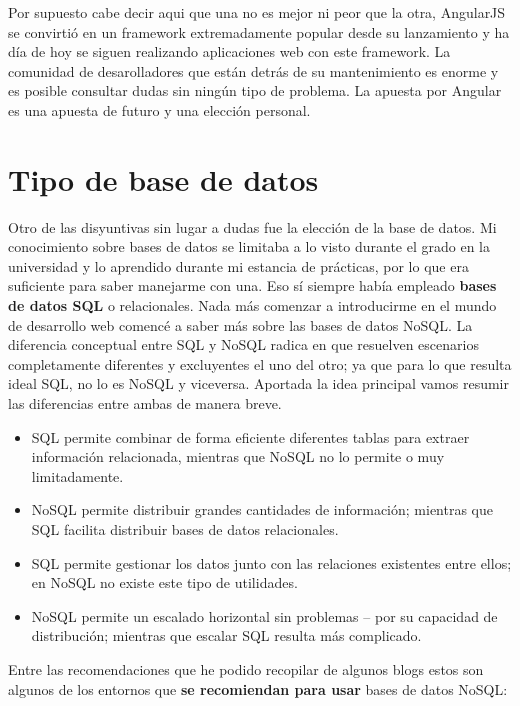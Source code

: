 Por supuesto cabe decir aqui que una no es mejor ni peor que la otra, AngularJS se convirtió en un framework extremadamente popular desde su lanzamiento \cite{angularmarket} y ha día de hoy se siguen realizando aplicaciones web con este framework. La comunidad de desarolladores que están detrás de su mantenimiento es enorme y es posible consultar dudas sin ningún tipo de problema. La apuesta por Angular es una apuesta de futuro y una elección personal.


  \section{Tipo de base de datos}\label{base de datos}
  
  Otro de las disyuntivas sin lugar a dudas fue la elección de la base de datos. Mi conocimiento sobre bases de datos se limitaba a lo visto durante el grado en la universidad y lo aprendido durante mi estancia de prácticas, por lo que era suficiente para saber manejarme con una. Eso sí siempre había empleado \textbf{bases de datos SQL} o relacionales. Nada más comenzar a introducirme en el mundo de desarrollo web comencé a saber más sobre las bases de datos NoSQL. La diferencia conceptual entre SQL y NoSQL radica en que resuelven escenarios completamente diferentes y excluyentes el uno del otro; ya que para lo que resulta ideal SQL, no lo es NoSQL y viceversa. Aportada la idea principal vamos resumir las diferencias entre ambas de manera breve. 
  
  \begin{itemize}
    \item SQL permite combinar de forma eficiente diferentes tablas para extraer información relacionada, mientras que NoSQL no lo permite o muy limitadamente.
    \item NoSQL permite distribuir grandes cantidades de información; mientras que SQL facilita distribuir bases de datos relacionales.
    \item SQL permite gestionar los datos junto con las relaciones existentes entre ellos; en NoSQL no existe este tipo de utilidades.
    \item NoSQL permite un escalado horizontal sin problemas – por su capacidad de distribución; mientras que escalar SQL resulta más complicado.
   \end{itemize}
   
    Entre las recomendaciones que he podido recopilar de algunos blogs \cite{blog1} \cite{blog2}  estos son algunos de los entornos que \textbf{se recomiendan para usar} bases de datos NoSQL:
    
